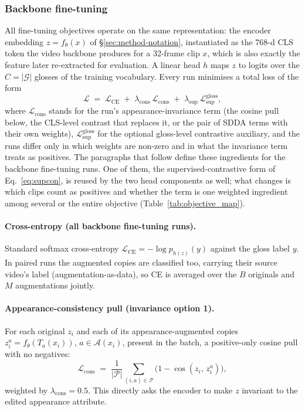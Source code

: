 \subsubsection{Backbone fine-tuning}
All fine-tuning objectives operate on the same representation: the
encoder embedding $z = f_\theta(x)$ of \S\ref{sec:method-notation},
instantiated as the 768-d CLS token the video backbone produces for a
32-frame clip $x$, which is also exactly the feature later re-extracted for
evaluation. A linear head $h$ maps $z$ to logits over the $C=|\mathcal{G}|$ glosses
of the training vocabulary. Every run minimises a total loss of the form
\begin{equation}
\label{eq:master}
\mathcal{L} \;=\; \mathcal{L}_{\mathrm{CE}}
\;+\; \lambda_{\mathrm{cons}}\, \mathcal{L}_{\mathrm{cons}}
\;+\; \lambda_{\mathrm{sup}}\, \mathcal{L}_{\mathrm{sup}}^{\mathrm{gloss}},
\end{equation}
where $\mathcal{L}_{\mathrm{cons}}$ stands for the run's
appearance-invariance term (the cosine pull below, the CLS-level contrast
that replaces it, or the pair of SDDA terms with their own weights),
$\mathcal{L}_{\mathrm{sup}}^{\mathrm{gloss}}$ for the optional gloss-level
contrastive auxiliary, and the runs differ only in which weights are
non-zero and in what the invariance term treats as positives. The
paragraphs that follow define these ingredients for the backbone
fine-tuning runs. One of them, the supervised-contrastive form of
Eq.~\eqref{eq:supcon}, is reused by the two head components as well; what
changes is which clips count as positives and whether the term is one
weighted ingredient among several or the entire objective
(Table~\ref{tab:objective_map}).

\paragraph{Cross-entropy (all backbone fine-tuning runs).}
Standard softmax cross-entropy $\mathcal{L}_{\mathrm{CE}} =
-\log p_{h(z)}(y)$ against the gloss label $y$. In paired runs the
augmented copies are classified too, carrying their source video's label
(augmentation-as-data), so CE is averaged over the $B$ originals and $M$
augmentations jointly.

\paragraph{Appearance-consistency pull (invariance option 1).}
For each original $z_i$ and each of its appearance-augmented copies
$z_i^{a} = f_\theta(T_a(x_i))$, $a \in \mathcal{A}(x_i)$, present in the batch, a
positive-only cosine pull with no negatives:
\begin{equation}
\mathcal{L}_{\mathrm{cons}} \;=\;
\frac{1}{|\mathcal{P}|}\sum_{(i,a)\in\mathcal{P}}
\bigl(1 - \cos(z_i,\, z_i^{a})\bigr),
\end{equation}
weighted by $\lambda_{\mathrm{cons}}=0.5$. This directly asks the encoder
to make $z$ invariant to the edited appearance attribute.

